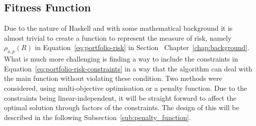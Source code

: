 \documentclass{pdfmx4020}
\begin{document}
    \subsection{Fitness Function} %
    \label{sub:fitness_function}
    Due to the nature of Haskell and with some mathematical background it is almost trivial to create a function to represent the measure of risk, namely $\rho_{a,p}(R)$ in Equation~\ref{eq:portfolio-risk} in Section~ Chapter~\ref{chap:background}. What is much more challenging is finding a way to include the constraints in Equation~\ref{eq:portfolio-risk-constraints} in a way that the algorithm can deal with the main function without violating these condition. Two methods were considered, using multi-objective optimisation or a penalty function. Due to the constraints being linear-independent, it will be straight forward to affect the optimal solution through factors of the constraints. The design of this will be described in the following Subsection~\ref{sub:penalty_function}.
\end{document}
